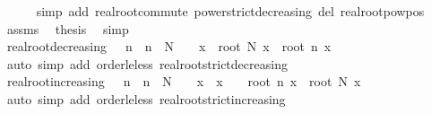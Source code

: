 \begin{isabellebody}
\ \ \ \ \isamarkupfalse%
\ {\isacharparenleft}{\kern0pt}simp\ add{\isacharcolon}{\kern0pt}\ real{\isacharunderscore}{\kern0pt}root{\isacharunderscore}{\kern0pt}commute\ power{\isacharunderscore}{\kern0pt}strict{\isacharunderscore}{\kern0pt}decreasing\ del{\isacharcolon}{\kern0pt}\ real{\isacharunderscore}{\kern0pt}root{\isacharunderscore}{\kern0pt}pow{\isacharunderscore}{\kern0pt}pos{}{\isacharparenright}{\kern0pt}\isanewline
\ \ \isamarkupfalse%
\ assms\ \isamarkupfalse%
\ {\isacharquery}{\kern0pt}thesis\ \isamarkupfalse%
\ simp\isanewline
{}\isamarkupfalse%
%
\endisatagproof
{\isafoldproof}%
%
\isadelimproof
\isanewline
%
\endisadelimproof
\isanewline
{}\isamarkupfalse%
\ real{\isacharunderscore}{\kern0pt}root{\isacharunderscore}{\kern0pt}decreasing{\isacharcolon}{\kern0pt}\ {\isachardoublequoteopen}{}\ {\isacharless}{\kern0pt}\ n\ {\isasymLongrightarrow}\ n\ {\isasymle}\ N\ {\isasymLongrightarrow}\ {}\ {\isasymle}\ x\ {\isasymLongrightarrow}\ root\ N\ x\ {\isasymle}\ root\ n\ x{\isachardoublequoteclose}\isanewline
%
\isadelimproof
\ \ %
\endisadelimproof
%
\isatagproof
{}\isamarkupfalse%
\ {\isacharparenleft}{\kern0pt}auto\ simp\ add{\isacharcolon}{\kern0pt}\ order{\isacharunderscore}{\kern0pt}le{\isacharunderscore}{\kern0pt}less\ real{\isacharunderscore}{\kern0pt}root{\isacharunderscore}{\kern0pt}strict{\isacharunderscore}{\kern0pt}decreasing{\isacharparenright}{\kern0pt}%
\endisatagproof
{\isafoldproof}%
%
\isadelimproof
\isanewline
%
\endisadelimproof
\isanewline
{}\isamarkupfalse%
\ real{\isacharunderscore}{\kern0pt}root{\isacharunderscore}{\kern0pt}increasing{\isacharcolon}{\kern0pt}\ {\isachardoublequoteopen}{}\ {\isacharless}{\kern0pt}\ n\ {\isasymLongrightarrow}\ n\ {\isasymle}\ N\ {\isasymLongrightarrow}\ {}\ {\isasymle}\ x\ {\isasymLongrightarrow}\ x\ {\isasymle}\ {}\ {\isasymLongrightarrow}\ root\ n\ x\ {\isasymle}\ root\ N\ x{\isachardoublequoteclose}\isanewline
%
\isadelimproof
\ \ %
\endisadelimproof
%
\isatagproof
{}\isamarkupfalse%
\ {\isacharparenleft}{\kern0pt}auto\ simp\ add{\isacharcolon}{\kern0pt}\ order{\isacharunderscore}{\kern0pt}le{\isacharunderscore}{\kern0pt}less\ real{\isacharunderscore}{\kern0pt}root{\isacharunderscore}{\kern0pt}strict{\isacharunderscore}{\kern0pt}increasing{\isacharparenright}{\kern0pt}%
\endisatagproof
{\isafoldproof}%
%
\isadelimproof
%
\endisadelimproof
%
\begin{isamarkuptext}%

\end{isamarkuptext}
\end{isabellebody}
